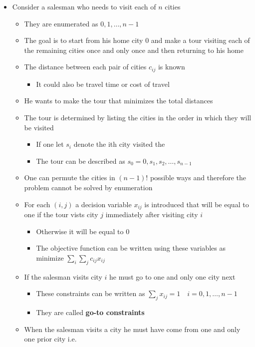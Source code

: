 \documentclass[11pt]{article}
\begin{document}
\begin{itemize}
\item Consider a salesman who needs to visit each of \(n\) cities
\begin{itemize}
\item They are enumerated as \(0,1,\dots, n-1\)
\item The goal is to start from his home city \(0\) and make a tour visiting each of the remaining cities once and only once and then returning to his home
\item The distance between each pair of cities \(c_{ij}\) is known
\begin{itemize}
\item It could also be travel time or cost of travel
\end{itemize}
\item He wants to make the tour that minimizes the total distances
\item The tour is determined by listing the cities in the order in which they will be visited
\begin{itemize}
\item If one let \(s_i\) denote the ith city visited the
\item The tour can be described as \(s_0 = 0, s_1, s_2, \dots, s_{n-1}\)
\end{itemize}
\item One can permute the cities in \((n-1)!\) possible ways and therefore the problem cannot be solved by enumeration
\item For each \((i,j)\) a decision variable \(x_{ij}\) is introduced that will be equal to one if the tour vists city \(j\) immediately after visiting city \(i\)
\begin{itemize}
\item Otherwise it will be equal to 0
\item The objective function can be written using these variables as minimize \(\sum_{i} \sum_{j} c_{ij} x_{ij}\)
\end{itemize}
\item If the salesman visits city \(i\) he must go to one and only one city next
\begin{itemize}
\item These constraints can be written as \(\sum_{j} x_{ij} = 1 \quad i=0,1,\dots,n-1\)
\item They are called \textbf{go-to constraints}
\end{itemize}
\item When the salesman visits a city he must have come from one and only one prior city i.e.

\end{itemize}
\end{itemize}
\end{document}
